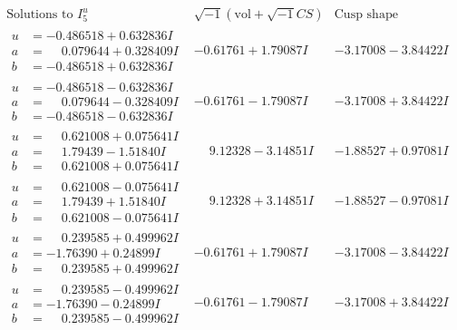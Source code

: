 \documentclass[1p]{elsarticle_modified}
\theoremstyle{definition}
\newcommand{\I}{\sqrt{-1}}
\begin{document}
$$\begin{array}{c|c|c}  
\text{Solutions to }I^u_{5}& \I (\text{vol} + \sqrt{-1}CS) & \text{Cusp shape}\\
 \hline 
\begin{aligned}
u &= -0.486518 + 0.632836 I \\
a &= \phantom{-}0.079644 + 0.328409 I \\
b &= -0.486518 + 0.632836 I\end{aligned}
 & -0.61761 + 1.79087 I & -3.17008 - 3.84422 I \\ \hline\begin{aligned}
u &= -0.486518 - 0.632836 I \\
a &= \phantom{-}0.079644 - 0.328409 I \\
b &= -0.486518 - 0.632836 I\end{aligned}
 & -0.61761 - 1.79087 I & -3.17008 + 3.84422 I \\ \hline\begin{aligned}
u &= \phantom{-}0.621008 + 0.075641 I \\
a &= \phantom{-}1.79439 - 1.51840 I \\
b &= \phantom{-}0.621008 + 0.075641 I\end{aligned}
 & \phantom{-}9.12328 - 3.14851 I & -1.88527 + 0.97081 I \\ \hline\begin{aligned}
u &= \phantom{-}0.621008 - 0.075641 I \\
a &= \phantom{-}1.79439 + 1.51840 I \\
b &= \phantom{-}0.621008 - 0.075641 I\end{aligned}
 & \phantom{-}9.12328 + 3.14851 I & -1.88527 - 0.97081 I \\ \hline\begin{aligned}
u &= \phantom{-}0.239585 + 0.499962 I \\
a &= -1.76390 + 0.24899 I \\
b &= \phantom{-}0.239585 + 0.499962 I\end{aligned}
 & -0.61761 + 1.79087 I & -3.17008 - 3.84422 I \\ \hline\begin{aligned}
u &= \phantom{-}0.239585 - 0.499962 I \\
a &= -1.76390 - 0.24899 I \\
b &= \phantom{-}0.239585 - 0.499962 I\end{aligned}
 & -0.61761 - 1.79087 I & -3.17008 + 3.84422 I \\ \hline\begin{aligned}

\end{aligned}
\end{array}$$
\end{document}
